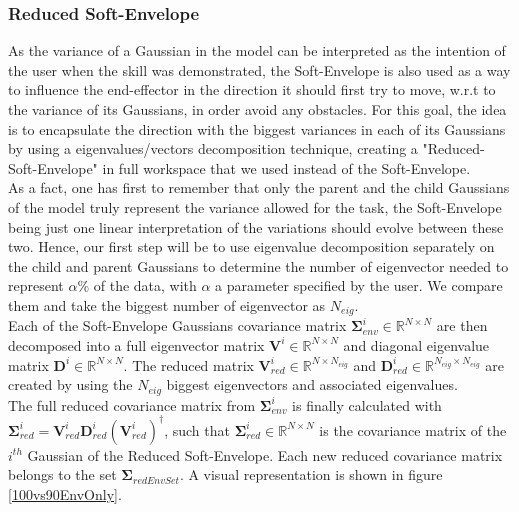 \documentclass[letterpaper, 10 pt, conference]{ieeeconf}  %
\newcommand{\mb}[1]{{\boldsymbol{#1}}}
\newcommand{\psin}{{\!\dagger}}
\begin{document}
\subsubsection{Reduced Soft-Envelope}\leavevmode\par \label{ReducedSoftEnvelope}
As the variance of a Gaussian in the model can be interpreted as the intention of the user when the skill was demonstrated, the Soft-Envelope is also used as a way to influence the end-effector in the direction it should first try to move, w.r.t to the variance of its Gaussians, in order avoid any obstacles. For this goal, the idea is to encapsulate the direction with the biggest variances in each of its Gaussians by using a eigenvalues/vectors decomposition technique, creating  a "Reduced-Soft-Envelope" in full workspace that we used instead of the Soft-Envelope. \\
As a fact, one has first to remember that only the parent and the child Gaussians of the model truly represent the variance allowed for the task, the Soft-Envelope being just one linear interpretation of the variations should evolve between these two. Hence, our first step will be to use eigenvalue decomposition separately on the child and parent Gaussians to determine the number of eigenvector needed to represent $\alpha \%$ of the data, with $\alpha$ a parameter specified by the user. We compare them and take the biggest number of eigenvector as $N_{eig}$. \\
 Each of the Soft-Envelope Gaussians covariance matrix $\mb{\Sigma}_{env}^i \in \mathbb{R}^{N \times N}$  are then decomposed into a full eigenvector matrix $\mb{V}^{i} \in \mathbb{R}^{N \times N}$ and diagonal eigenvalue matrix $\mb{D}^{i} \in \mathbb{R}^{N \times N}$. The reduced  matrix $\mb{V}_{red}^{i}\in \mathbb{R}^{N \times N_{eig}}$ and $\mb{D}_{red}^{i} \in \mathbb{R}^{N_{eig} \times N_{eig}}$ are created by using the $N_{eig}$ biggest eigenvectors and associated eigenvalues.\\
The full reduced covariance matrix from $\mb{\Sigma}_{env}^{i}$ is finally calculated with $\mb{\Sigma}_{red}^{i} =\mb{V}_{red}^{i} \mb{D}_{red}^{i}  (\mb{V}_{red}^{i})^{\psin}$, such that $\mb{\Sigma}_{red}^{i}  \in \mathbb{R}^{N \times N} $  is the covariance matrix of the $i^{th}$ Gaussian of the Reduced Soft-Envelope. Each new reduced covariance matrix belongs to the set $\mb{\Sigma}_{redEnvSet}$. A visual representation is shown in figure \ref{100vs90EnvOnly}.
\end{document}
